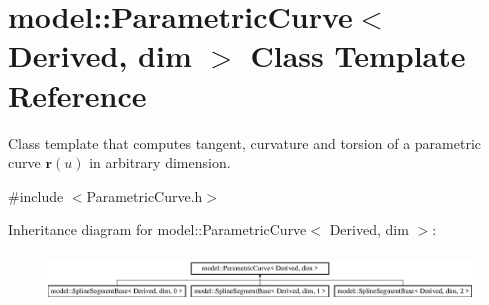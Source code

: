 \hypertarget{classmodel_1_1_parametric_curve}{}\section{model\+:\+:Parametric\+Curve$<$ Derived, dim $>$ Class Template Reference}
\label{classmodel_1_1_parametric_curve}


Class template that computes tangent, curvature and torsion of a parametric curve $\mathbf{r}(u)$ in arbitrary dimension.  




{\ttfamily \#include $<$Parametric\+Curve.\+h$>$}

Inheritance diagram for model\+:\+:Parametric\+Curve$<$ Derived, dim $>$\+:\begin{figure}[H]
\begin{center}
\leavevmode
\includegraphics[height=1.319199cm]{classmodel_1_1_parametric_curve}
\end{center}
\end{figure}
